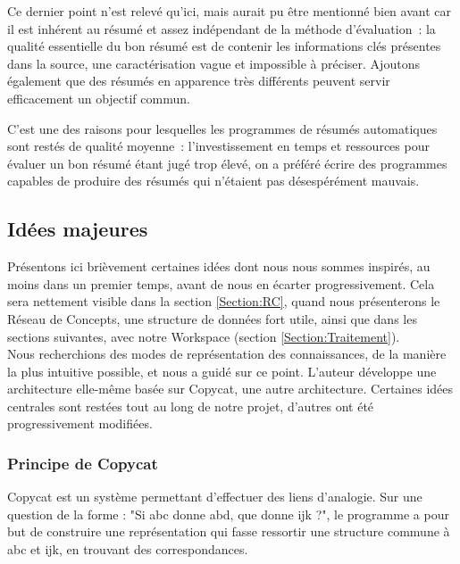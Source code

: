 \documentclass[a4paper, 12pt]{article}
\begin{document}
  Ce dernier point n'est relevé qu'ici, mais aurait pu être mentionné bien avant car il est inhérent au résumé et assez indépendant de la méthode d'évaluation~: la qualité essentielle du bon résumé est de contenir les informations clés présentes dans la source, une caractérisation vague et impossible à préciser. Ajoutons également que des résumés en apparence très différents peuvent servir efficacement un objectif commun. 
  
  C'est une des raisons pour lesquelles les programmes de résumés automatiques sont restés de qualité moyenne~: l'investissement en temps et ressources pour évaluer un bon résumé étant jugé trop élevé, on a préféré écrire des programmes capables de produire des résumés qui n'étaient pas désespérément mauvais.

 
\subsection{Idées majeures}

Présentons ici brièvement certaines idées dont nous nous sommes inspirés, au moins dans un premier temps, avant de nous en écarter progressivement. Cela sera nettement visible dans la section \ref{Section:RC}, quand nous présenterons le Réseau de Concepts, une structure de données fort utile, ainsi que dans les sections suivantes, avec notre Workspace (section \ref{Section:Traitement}).\\

Nous recherchions des modes de représentation des connaissances, de la manière la plus intuitive possible, et \cite{parmentier_specification_1998} nous a guidé sur ce point. L'auteur développe une architecture elle-même basée sur Copycat, une autre architecture. Certaines idées centrales sont restées tout au long de notre projet, d'autres ont été progressivement modifiées.

\subsubsection{Principe de Copycat}

Copycat est un système permettant d'effectuer des liens d'analogie. Sur une question de la forme : "Si abc donne abd, que donne ijk ?", le programme a pour but de construire une représentation qui fasse ressortir une structure commune à abc et ijk, en trouvant des correspondances.
\end{document}
